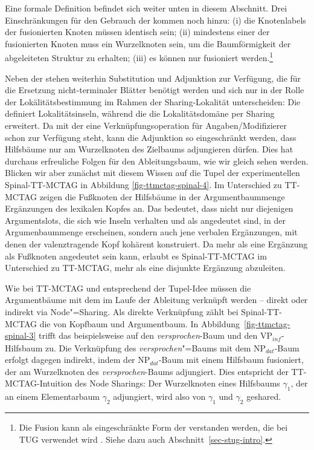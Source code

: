 Eine formale Definition befindet sich weiter unten in diesem Abschnitt. Drei Einschränkungen für den Gebrauch der  kommen noch hinzu: (i) die Knotenlabels der fusionierten Knoten müssen identisch sein; (ii) mindestens einer der fusionierten Knoten muss ein Wurzelknoten sein, um die Baumförmigkeit der abgeleiteten Struktur zu erhalten; (iii) es können nur  fusioniert werden.\footnote{Die Fusion kann als eingeschränkte Form der  verstanden werden, die bei TUG verwendet wird \citep{Popowich:89,Gerdes:04}. Siehe dazu auch Abschnitt~\ref{sec-stug-intro}.} 

Neben der  stehen weiterhin Substitution und Adjunktion zur Verfügung, die für die Ersetzung nicht-terminaler Blätter benötigt werden und sich nur in der Rolle der Lokälitätsbestimmung im Rahmen der Sharing-Lokalität unterscheiden: Die  definiert Lokalitätsinseln, während die  die Lokalitätsdomäne per Sharing erweitert. Da mit der  eine Verknüpfungsoperation für Angaben/Modifizierer schon zur Verfügung steht, kann die Adjunktion so eingeschränkt werden, dass Hilfsbäume nur am Wurzelknoten des Zielbaums adjungieren dürfen. Dies hat durchaus erfreuliche Folgen für den Ableitungsbaum, wie wir gleich sehen werden. Blicken wir aber zunächst mit diesem Wissen auf die Tupel der experimentellen Spinal-TT-MCTAG in Abbildung \ref{fig-ttmctag-spinal-4}. 
Im Unterschied zu TT-MCTAG zeigen die Fu\ss knoten der Hilfsbäume in der Argumentbaummenge Ergänzungen des lexikalen Kopfes an. Das bedeutet, dass nicht nur diejenigen Argumentslots, die sich wie Inseln verhalten und als  angedeutet sind, in der Argumenbaummenge erscheinen,  sondern auch jene verbalen Ergänzungen, mit denen der valenztragende Kopf kohärent konstruiert. Da mehr als eine Ergänzung als Fu\ss knoten angedeutet sein kann, erlaubt es Spinal-TT-MCTAG im Unterschied zu TT-MCTAG, mehr als eine disjunkte Ergänzung abzuleiten.  

Wie bei TT-MCTAG und entsprechend der Tupel-Idee müssen die Argumentbäume mit dem  im Laufe der Ableitung verknüpft werden -- direkt oder indirekt via Node"=Sharing. Als direkte Verknüpfung zählt bei Spinal-TT-MCTAG die  von Kopfbaum und Argumentbaum. In Abbildung~\ref{fig-ttmctag-spinal-3} trifft das beispielsweise auf den {\it versprochen}-Baum und den VP$_{\mathit{inf}}$-Hilfsbaum zu. Die Verknüpfung des {\it versprochen}"=Baums mit dem NP$_{\mathit{dat}}$-Baum erfolgt dagegen indirekt, indem der NP$_{\mathit{dat}}$-Baum mit einem Hilfsbaum fusioniert, der am Wurzelknoten des {\it versprochen}-Baums adjungiert. Dies entspricht der TT-MCTAG-Intuition des Node Sharings: Der Wurzelknoten eines Hilfsbaums $\gamma_1$, der an einem Elementarbaum $\gamma_2$ adjungiert, wird also von $\gamma_1$ und $\gamma_2$ geshared.

